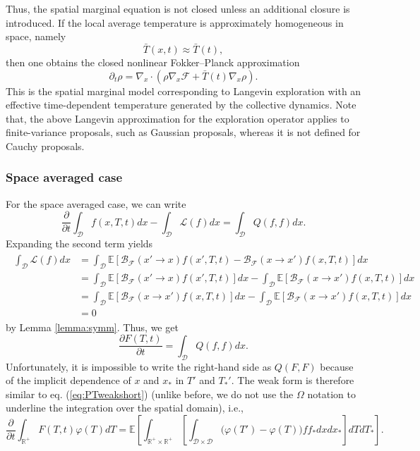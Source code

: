 \documentclass[10pt,a4paper]{article}
\theoremstyle{theorem}
\numberwithin{equation}{section}
\begin{document}
Thus, the spatial marginal equation is not closed unless an additional closure is
introduced. If the local average temperature is approximately homogeneous in
space, namely
\[
\bar T(x,t)\approx \bar T(t),
\]
then one obtains the closed nonlinear Fokker--Planck approximation
\begin{equation}
\partial_t\rho
=
\nabla_x\cdot\left(
\rho\nabla_x\mathcal F
+
\bar T(t)\nabla_x\rho
\right).
\end{equation}
This is the spatial marginal model corresponding to Langevin exploration with an
effective time-dependent temperature generated by the collective dynamics.
Note that, the above Langevin approximation for the exploration operator applies to finite-variance proposals, such as Gaussian proposals, whereas it is not defined for Cauchy proposals.


\subsubsection{Space averaged case}
\label{subsec:meanfield_space}
For the space averaged case, we can write
\begin{equation}
\frac{\partial}{\partial t}\int_{\mathcal D}f(x,T,t)dx-\int_{\mathcal D}\mathcal{L}(f)dx=\int_{\mathcal D}Q(f,f)dx.
\end{equation}
Expanding the second term yields
\begin{align}
\begin{split}
\int_{\mathcal D}\mathcal{L}(f)dx&=\int_{\mathcal D}\mathbb{E}\left[\mathcal{B}_\mathcal{F}(x'\rightarrow x)f(x',T,t)-\mathcal{B}_\mathcal{F}(x\rightarrow x')f(x,T,t)\right] dx\\
&=\int_{\mathcal D}\mathbb{E}\left[\mathcal{B}_\mathcal{F}(x'\rightarrow x)f(x',T,t)\right] dx-\int_{\mathcal D}\mathbb{E}\left[\mathcal{B}_\mathcal{F}(x\rightarrow x')f(x,T,t)\right] dx\\
&=\int_{\mathcal D}\mathbb{E}\left[\mathcal{B}_\mathcal{F}(x\rightarrow x')f(x,T,t)\right] dx-\int_{\mathcal D}\mathbb{E}\left[\mathcal{B}_\mathcal{F}(x\rightarrow x')f(x,T,t)\right] dx\\
&=0
\end{split}
\end{align}
by Lemma \ref{lemma:symm}. Thus, we get
\begin{equation}
\label{eq:tau}
\frac{\partial F(T,t)}{\partial t}=\int_{\mathcal D}Q(f,f)dx.
\end{equation}
Unfortunately, it is impossible to write the right-hand side as $Q(F,F)$ because of the implicit dependence of $x$ and $x_*$ in $T'$ and $T_*'$. The weak form is therefore similar to eq. (\ref{eq:PTweakshort}) (unlike before, we do not use the $\Omega$ notation to underline the integration over the spatial domain), i.e., 
\begin{equation}
\label{eq:tau_weak}
\frac{\partial}{\partial t}\int_{\mathbb{R}^+} F(T,t)\varphi(T)dT=\mathbb{E}\left[\int_{\mathbb{R}^+\times\mathbb{R}^+}\left[\int_{\mathcal D\times\mathcal D}\big(\varphi(T')-\varphi(T)\big) ff_*dxdx_*\right] dTdT_*\right].
\end{equation}
\end{document}
